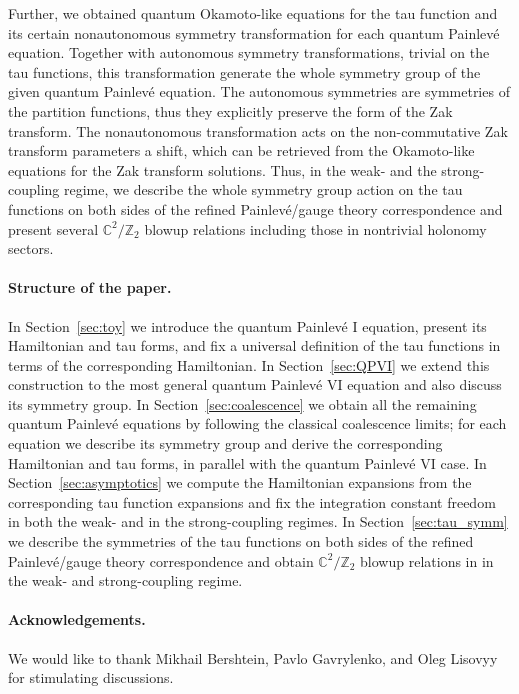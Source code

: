 \documentclass[12pt,a4paper]{article}
\numberwithin{equation}{section}
\begin{document}
Further, we obtained quantum Okamoto-like equations for the tau function and its certain nonautonomous symmetry transformation for each quantum Painlev\'e equation. Together with autonomous symmetry transformations, trivial on the tau functions, this transformation generate the whole symmetry group of the given quantum Painlev\'e equation. The autonomous symmetries are symmetries of the partition functions, thus they explicitly preserve the form of the Zak transform. The nonautonomous transformation acts on the non-commutative Zak transform parameters a shift, which can be retrieved from the Okamoto-like equations for the Zak transform solutions. 
Thus, in the weak- and the strong-coupling regime, we describe the whole symmetry group action on the tau functions on both sides of the refined Painlev\'e/gauge theory correspondence and present several $\mathbb{C}^2/\mathbb{Z}_2$ blowup relations including those in nontrivial holonomy sectors.

\paragraph{Structure of the paper.} In Section~\ref{sec:toy} we introduce the quantum Painlev\'e I equation, present its Hamiltonian and tau forms, and fix a universal definition of the tau functions in terms of the corresponding Hamiltonian. In Section~\ref{sec:QPVI} we extend this construction to the most general quantum Painlev\'e VI equation and also discuss its symmetry group.
In Section~\ref{sec:coalescence} we obtain all the remaining quantum Painlev\'e equations by following the classical coalescence limits; for each equation we describe its symmetry group and derive the corresponding Hamiltonian and tau forms, in parallel with the quantum Painlev\'e VI case.
In Section~\ref{sec:asymptotics} we compute the Hamiltonian expansions from the corresponding tau function expansions and fix the integration constant freedom in both the weak- and in the strong-coupling regimes.
In Section~\ref{sec:tau_symm} we describe the symmetries of the tau functions on both sides of the refined Painlev\'e/gauge theory correspondence and obtain  $\mathbb{C}^2/\mathbb{Z}_2$ blowup relations in in the weak- and strong-coupling regime.

\paragraph{Acknowledgements.}
We would like to thank Mikhail Bershtein, Pavlo Gavrylenko, and Oleg Lisovyy for stimulating discussions.
\end{document}
